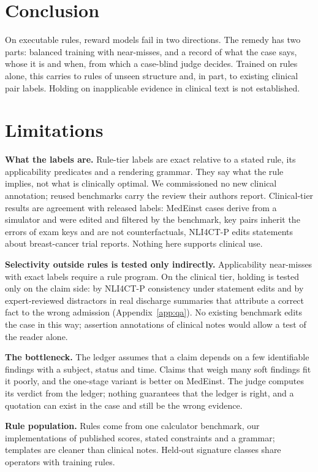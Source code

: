 \documentclass[11pt]{article}
\begin{document}
\section{Conclusion}

On executable rules, reward models fail in two directions. The remedy has two
parts: balanced training with near-misses, and a record of what the case says,
whose it is and when, from which a case-blind judge decides. Trained on
rules alone, this carries to rules of unseen structure and, in part, to
existing clinical pair labels. Holding on inapplicable evidence in clinical
text is not established.

\section*{Limitations}

\textbf{What the labels are.} Rule-tier labels are exact relative to a stated
rule, its applicability predicates and a rendering grammar. They say what the
rule implies, not what is clinically optimal. We commissioned no new clinical
annotation; reused benchmarks carry the review their authors report.
Clinical-tier results are agreement with released labels: MedEinst cases
derive from a simulator and were edited and filtered by the benchmark, key
pairs inherit the errors of exam keys and are not counterfactuals, NLI4CT-P
edits statements about breast-cancer trial reports. Nothing here supports
clinical use.

\textbf{Selectivity outside rules is tested only indirectly.} Applicability near-misses
with exact labels require a rule program. On the clinical tier, holding is tested only on
the claim side: by NLI4CT-P consistency under statement edits and by
expert-reviewed distractors in real discharge summaries that attribute a
correct fact to the wrong admission \citep{kim2026ehrnotechatqa}
(Appendix~\ref{app:qa}). No existing benchmark edits the case in this way;
assertion annotations of clinical notes \citep{uzuner2011i2b2} would allow a
test of the reader alone.

\textbf{The bottleneck.} The ledger assumes that a claim depends on a few
identifiable findings with a subject, status and time. Claims that weigh many
soft findings fit it poorly, and the one-stage variant is better on MedEinst.
The judge computes its verdict from the ledger; nothing guarantees that the
ledger is right, and a quotation can exist in the case and still be the wrong
evidence.

\textbf{Rule population.} Rules come from one calculator benchmark, our
implementations of published scores, stated constraints and a grammar;
templates are cleaner than clinical notes. Held-out signature classes share
operators with training rules.
\end{document}
